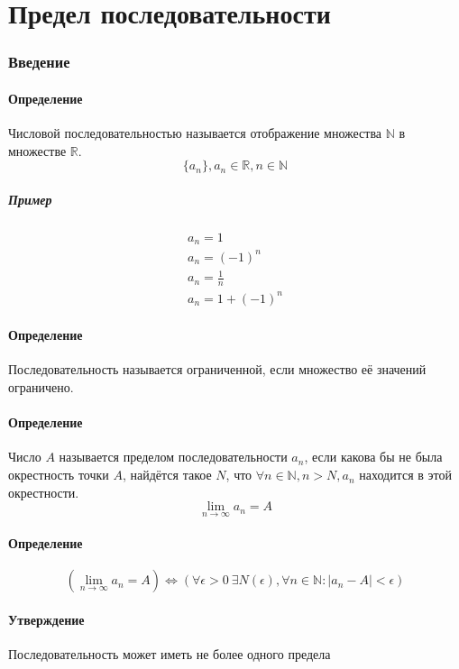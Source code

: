 \documentclass{article}
\begin{document}
\part{Предел последовательности}

\section{Введение}

\subsection{Определение}
Числовой последовательностью называется отображение множества $\mathbb{N}$ в множестве $\mathbb{R}$.
\[
\{a_n\}, a_n \in \mathbb{R}, n \in \mathbb{N}
\]

\subsubsection{Пример}
\begin{gather*}
    a_n = 1 \\
    a_n = (-1)^n \\
    a_n = \frac{1}{n} \\
    a_n = 1 + (-1)^n
\end{gather*}


\subsection{Определение}
Последовательность называется ограниченной, если множество её значений ограничено.


\subsection{Определение}
Число $A$ называется пределом последовательности $a_n$, если какова бы не была окрестность точки $A$, найдётся такое $N$, что $\forall n \in \mathbb{N}, n > N, a_n$ находится в этой окрестности.
\[
\lim_{n \to \infty} a_n = A
\]


\subsection{Определение}
\[
(\lim_{n \to \infty} a_n = A) \Leftrightarrow (\forall \epsilon > 0 ~ \exists N(\epsilon), \forall n \in \mathbb{N}: |a_n - A| < \epsilon)
\]


\subsection{Утверждение}
Последовательность может иметь не более одного предела
\end{document}
